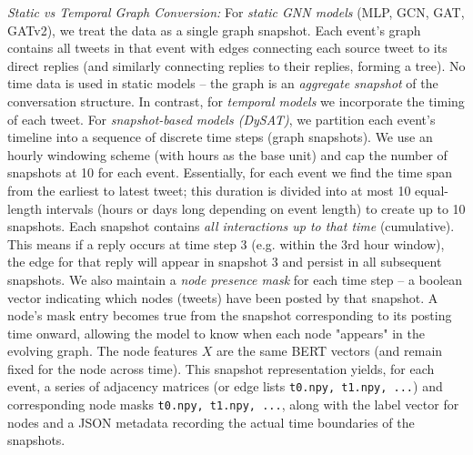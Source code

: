 \documentclass{cshonours}
\begin{document}
\emph{Static vs Temporal Graph Conversion:} For \emph{static GNN models} (MLP, GCN, GAT, GATv2), we treat the data as a single graph snapshot. Each event's graph contains all tweets in that event with edges connecting each source tweet to its direct replies (and similarly connecting replies to their replies, forming a tree). No time data is used in static models – the graph is an \emph{aggregate snapshot} of the conversation structure. In contrast, for \emph{temporal models} we incorporate the timing of each tweet. For \emph{snapshot-based models (DySAT)}, we partition each event's timeline into a sequence of discrete time steps (graph snapshots). We use an hourly windowing scheme (with hours as the base unit) and cap the number of snapshots at 10 for each event. Essentially, for each event we find the time span from the earliest to latest tweet; this duration is divided into at most 10 equal-length intervals (hours or days long depending on event length) to create up to 10 snapshots. Each snapshot contains \emph{all interactions up to that time} (cumulative). This means if a reply occurs at time step 3 (e.g. within the 3rd hour window), the edge for that reply will appear in snapshot 3 and persist in all subsequent snapshots. We also maintain a \emph{node presence mask} for each time step – a boolean vector indicating which nodes (tweets) have been posted by that snapshot. A node's mask entry becomes true from the snapshot corresponding to its posting time onward, allowing the model to know when each node "appears" in the evolving graph. The node features $X$ are the same BERT vectors (and remain fixed for the node across time). This snapshot representation yields, for each event, a series of adjacency matrices (or edge lists \texttt{t0.npy, t1.npy, ...}) and corresponding node masks \texttt{t0.npy, t1.npy, ...}, along with the label vector for nodes and a JSON metadata recording the actual time boundaries of the snapshots.
\end{document}
